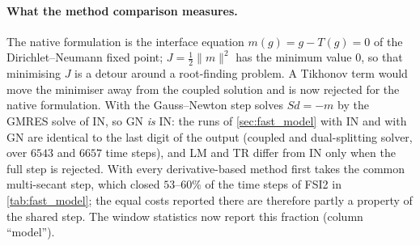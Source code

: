 \documentclass[11pt,a4paper]{article}
\theoremstyle{definition}
\theoremstyle{remark}
\begin{document}
\begin{table}[ht]\centering
\caption{FSI2 from rest to $t=15$~s, dual-splitting fluid solver, $3$ runs in parallel: IQN-ILS
against the secant method with the same displacement criterion. Deviation: maximal deviation of the
tip displacement from IQN-ILS with $\mathrm{RelTol}=10^{-7}$, relative to its maximum; wall times
of one batch.}\label{tab:criterion}
\end{table}

\paragraph{What the method comparison measures.} The native formulation is the interface equation
$m(g)=g-T(g)=0$ of the Dirichlet--Neumann fixed point; $J=\tfrac12\|m\|^2$ has the minimum value
$0$, so that minimising $J$ is a detour around a root-finding problem. A Tikhonov term would move
the minimiser away from the coupled solution and is now rejected for the native formulation. With
 the Gauss--Newton step solves $Sd=-m$ by the GMRES solve of IN, so GN
\emph{is} IN: the runs of \cref{sec:fast_model} with IN and with GN are identical to the last digit
of the output (coupled and dual-splitting solver, over $6543$ and $6657$ time steps), and LM and TR
differ from IN only when the full step is rejected. With  every
derivative-based method first takes the common multi-secant step, which closed $53$--$60\%$ of the
time steps of FSI2 in \cref{tab:fast_model}; the equal costs reported there are therefore partly a
property of the shared step. The window statistics now report this fraction (column ``model'').
\end{document}
